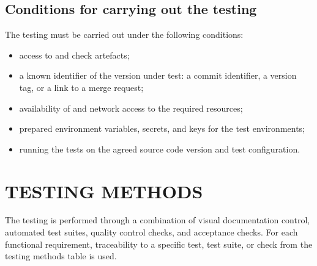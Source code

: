 \documentclass[12pt,a4paper]{extarticle}
\begin{document}
\subsection{Conditions for carrying out the testing}

\begin{hseExample}
The testing must be carried out under the following conditions:

\begin{itemize}[leftmargin=1.25cm]
    \item access to  and check artefacts;
    \item a known identifier of the version under test: a commit identifier, a version tag, or a link to a merge request;
    \item availability of  and network access to the required resources;
    \item prepared environment variables, secrets, and keys for the test environments;
    \item running the tests on the agreed source code version and test configuration.
\end{itemize}
\end{hseExample}

\clearpage

\section{TESTING METHODS}
\label{sec:methods}

\begin{hseExample}
The testing is performed through a combination of visual documentation control, automated test suites, quality control checks, and acceptance checks. For each functional requirement, traceability to a specific test, test suite, or check from the testing methods table is used.
\end{hseExample}

\end{document}

